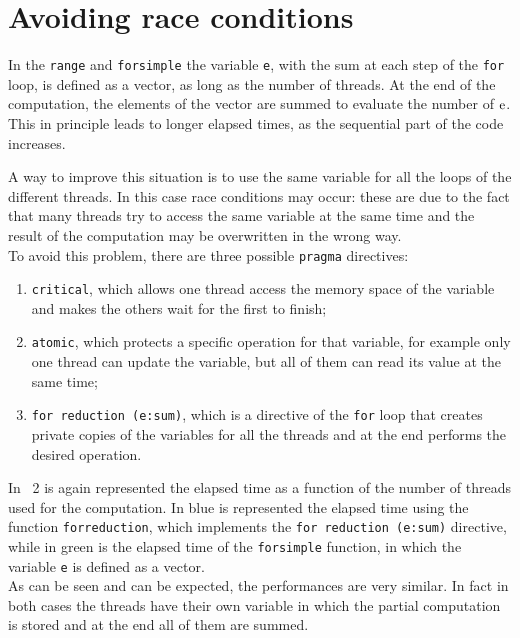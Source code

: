 \documentclass[11pt,a4paper]{article}
\begin{document}
\section{Avoiding race conditions}
\par In the  \verb+range+ and \verb+forsimple+ the variable \verb+e+, with the sum at each step of the \verb+for+ loop, is defined as a vector, as long as the number of threads.
At the end of the computation, the elements of the vector are summed to evaluate the number of $\operatorname{e}$.
This in principle leads to longer elapsed times, as the sequential part of the code increases.
\par A way to improve this situation is to use the same variable for all the loops of the different threads.
In this case race conditions may occur: these are due to the fact that many threads try to access the same variable at the same time and the result of the computation may be overwritten in the wrong way.\\
To avoid this problem, there are three possible \verb+pragma+ directives:
\begin{enumerate}
	\item \verb+critical+, which allows one thread access the memory space of the variable and  makes the others wait for the first to finish;
	\item \verb+atomic+, which protects a specific operation for that variable, for example only one thread can update the variable, but all of them can read its value at the same time;
	\item \verb+for reduction (e:sum)+, which is a directive of the \verb+for+ loop that creates private copies of the variables for all the threads and at the end performs the desired operation.
\end{enumerate}
\par In \figurename~2 is again represented the elapsed time as a function of the number of threads used for the computation.
In blue is represented the elapsed time using the function \verb+forreduction+, which implements the \verb+for reduction (e:sum)+ directive, while in green is the elapsed time of the \verb+forsimple+ function, in which the variable \verb+e+ is defined as a vector.\\
As can be seen and can be expected, the performances are very similar.
In fact in both cases the threads have their own variable in which the partial computation is stored and at the end all of them are summed.
\end{document}
